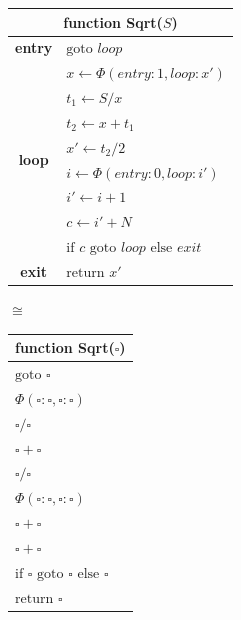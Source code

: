\begin{figure}[h]
\begin{minipage}{0.39\textwidth}
\begin{tabular}{|cl|}
\multicolumn{2}{c}{{\bf function} Sqrt($S$)}\\
\hline
{\bf entry} & $\text{goto } loop$\\
\hline
\multirow{8}{*}{\bf loop} & $x \leftarrow \Phi(entry:1,loop:x')$\\
                          & $t_1\leftarrow S/x$\\
                          & $t_2\leftarrow x+t_1$\\
                          & $x'\leftarrow t_2/2$\\
                          & $i\leftarrow \Phi(entry:0,loop:i')$\\
                          & $i'\leftarrow i+1$\\
                          & $c\leftarrow i'+N$\\
                          & $\text{if }c\text{ goto }loop\text{ else }exit$\\
\hline
{\bf exit} & $\text{return }x'$\\
\hline
\end{tabular}
\end{minipage}
\begin{minipage}{0.04\textwidth}
\centering
$\cong$
\end{minipage}
\begin{minipage}{0.22\textwidth}
\begin{tabular}{|l|}
\multicolumn{1}{c}{{\bf function} Sqrt($\square$)}\\
\hline
$\text{goto } \square$\\
$\Phi(\square:\square,\square:\square)$\\
$\square/\square$\\
$\square+\square$\\
$\square/\square$\\
$\Phi(\square:\square,\square:\square)$\\
$\square+\square$\\
$\square+\square$\\
$\text{if }\square\text{ goto }\square\text{ else }\square$\\
$\text{return }\square$\\
\hline
\end{tabular}
\end{minipage}
\begin{minipage}{0.04\textwidth}

\end{minipage}
\end{figure}
